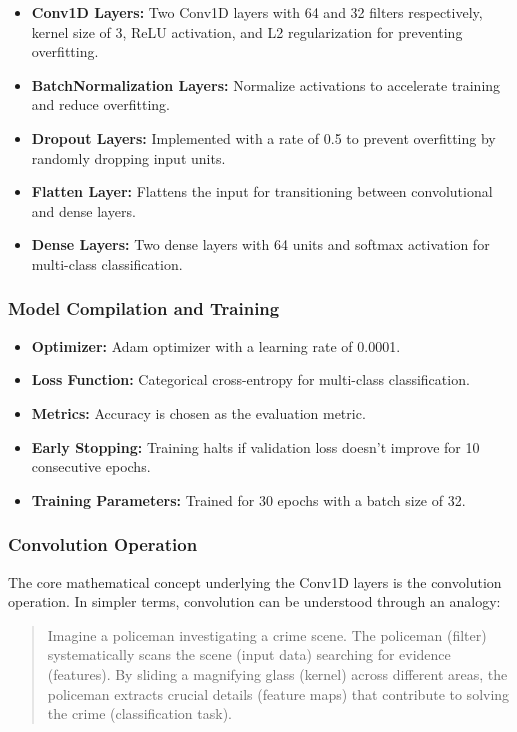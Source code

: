 \begin{itemize}
    \item \textbf{Conv1D Layers:} Two Conv1D layers with 64 and 32 filters respectively, kernel size of 3, ReLU activation, and L2 regularization for preventing overfitting.
    \item \textbf{BatchNormalization Layers:} Normalize activations to accelerate training and reduce overfitting.
    \item \textbf{Dropout Layers:} Implemented with a rate of 0.5 to prevent overfitting by randomly dropping input units.
    \item \textbf{Flatten Layer:} Flattens the input for transitioning between convolutional and dense layers.
    \item \textbf{Dense Layers:} Two dense layers with 64 units and softmax activation for multi-class classification.
\end{itemize}

\subsubsection{Model Compilation and Training}

\begin{itemize}
    \item \textbf{Optimizer:} Adam optimizer with a learning rate of 0.0001.
    \item \textbf{Loss Function:} Categorical cross-entropy for multi-class classification.
    \item \textbf{Metrics:} Accuracy is chosen as the evaluation metric.
    \item \textbf{Early Stopping:} Training halts if validation loss doesn't improve for 10 consecutive epochs.
    \item \textbf{Training Parameters:} Trained for 30 epochs with a batch size of 32.
\end{itemize}


\subsubsection{Convolution Operation}

The core mathematical concept underlying the Conv1D layers is the convolution operation. In simpler terms, convolution can be understood through an analogy:

\begin{quote}
 Imagine a policeman investigating a crime scene. The policeman (filter) systematically scans the scene (input data) searching for evidence (features). By sliding a magnifying glass (kernel) across different areas, the policeman extracts crucial details (feature maps) that contribute to solving the crime (classification task).
\end{quote}

